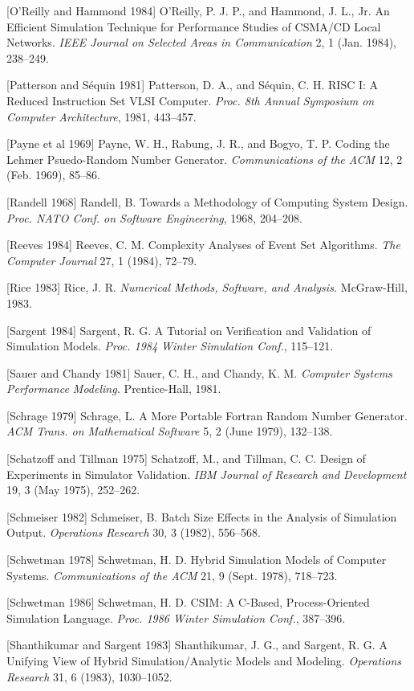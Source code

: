 [O'Reilly and Hammond 1984] O'Reilly, P. J. P., and Hammond, J. L., Jr. An Efficient Simulation Technique for Performance Studies of CSMA/CD Local Networks. \textit{IEEE Journal on Selected Areas in Communication} 2, 1 (Jan. 1984), 238--249.

[Patterson and S\'equin 1981] Patterson, D. A., and S\'equin, C. H. RISC I: A Reduced Instruction Set VLSI Computer. \textit{Proc. 8th Annual Symposium on Computer Architecture}, 1981, 443--457.

[Payne et al 1969] Payne, W. H., Rabung, J. R., and Bogyo, T. P. Coding the Lehmer Psuedo-Random Number Generator. \textit{Communications of the ACM} 12, 2 (Feb. 1969), 85--86.

[Randell 1968] Randell, B. Towards a Methodology of Computing System Design. \textit{Proc. NATO Conf. on Software Engineering}, 1968, 204--208.

[Reeves 1984] Reeves, C. M. Complexity Analyses of Event Set Algorithms. \textit{The Computer Journal} 27, 1 (1984), 72--79.

[Rice 1983] Rice, J. R. \textit{Numerical Methods, Software, and Analysis.} McGraw-Hill, 1983.

[Sargent 1984] Sargent, R. G. A Tutorial on Verification and Validation of Simulation Models. \textit{Proc. 1984 Winter Simulation Conf.}, 115--121.

[Sauer and Chandy 1981] Sauer, C. H., and Chandy, K. M. \textit{Computer Systems Performance Modeling.} Prentice-Hall, 1981.

[Schrage 1979] Schrage, L. A More Portable Fortran Random Number Generator. \textit{ACM Trans. on Mathematical Software} 5, 2 (June 1979), 132--138.

[Schatzoff and Tillman 1975] Schatzoff, M., and Tillman, C. C. Design of Experiments in Simulator Validation. \textit{IBM Journal of Research and Development} 19, 3 (May 1975), 252--262.

[Schmeiser 1982] Schmeiser, B. Batch Size Effects in the Analysis of Simulation Output. \textit{Operations Research} 30, 3 (1982), 556--568.

[Schwetman 1978] Schwetman, H. D. Hybrid Simulation Models of Computer Systems. \textit{Communications of the ACM} 21, 9 (Sept. 1978), 718--723.

[Schwetman 1986] Schwetman, H. D. CSIM: A C-Based, Process-Oriented Simulation Language. \textit{Proc. 1986 Winter Simulation Conf.}, 387--396.

[Shanthikumar and Sargent 1983] Shanthikumar, J. G., and Sargent, R. G. A Unifying View of Hybrid Simulation/Analytic Models and Modeling. \textit{Operations Research} 31, 6 (1983), 1030--1052.

